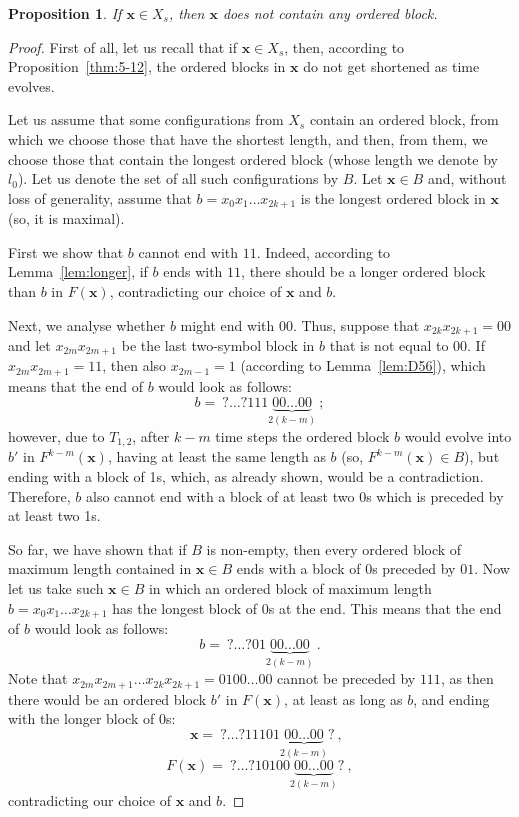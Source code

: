 \documentclass{sn-jnl}
\newtheorem{prop}{Proposition}%
\newcommand{\xconst}{X_{s}}
\newcommand{\bx}{\mathbf{x}}
\begin{document}
\begin{prop}
\label{lem:snakes}
If $\bx\in \xconst$, then $\bx$ does not contain any ordered block.
\end{prop}
\begin{proof}
First of all, let us recall that if $\bx\in\xconst$, then, according to Proposition~\ref{thm:5-12}, the ordered blocks in $\bx$ do not get shortened as time evolves.

Let us assume that some configurations from $\xconst$ contain an ordered block, from which we choose those that have the shortest length, and then, from them, we choose  those that contain the longest ordered block (whose length we denote by $l_0$). Let us denote the set of all such configurations by $B$. 
Let $\bx\in B$ and, without loss of generality, assume that $b=x_{0}x_1\ldots x_{2k+1}$ is the longest ordered block in $\bx$ (so, it is maximal). 

First we show that $b$ cannot end with $11$. 
Indeed, according to Lemma~\ref{lem:longer}, if $b$ ends with $11$, there should be a longer ordered block than $b$ in $F(\bx)$, contradicting our choice of $\bx$ and $b$.

Next, we analyse whether $b$ might end with $00$. Thus, suppose that $x_{2k}x_{2k+1}=00$ and let $x_{2m}x_{2m+1}$ be the last two-symbol block in $b$ that is not equal to $00$. If $x_{2m}x_{2m+1}=11$, then also  $x_{2m-1}=1$ (according to Lemma~\ref{lem:D56}), which means that the end of $b$ would look as follows: 
\[
b = \ ?\ldots?111\underbrace{00\ldots 00}_{2(k-m)}\ ;
\]
however, due to $T_{1,2}$, after $k-m$ time steps the ordered block $b$ would evolve into $b'$ in $F^{k-m}(\bx)$, having at least the same length as $b$ (so, $F^{k-m}(\bx)\in B$), but ending with a block of 1s, which, as already shown, would be a contradiction. Therefore, $b$ also cannot end with a block of at least two 0s which is preceded by at least two 1s.

So far, we have shown that if $B$ is non-empty, then every ordered block of maximum length contained in $\bx\in B$ ends with a block of 0s preceded by $01$. Now let us take such $\bx\in B$ in which an ordered block of maximum length $b=x_{0}x_1\ldots x_{2k+1}$ has the longest block of 0s at the end. This means that the end of $b$ would look as follows: 
\[
b=\ ?\ldots?01\underbrace{00\ldots 00}_{2(k-m)}\ .
\]
Note that $x_{2m}x_{2m+1}\ldots x_{2k}x_{2k+1}=0100\ldots 00$ cannot be preceded by $111$, as then there would be an ordered block $b'$ in $F(\bx)$, at least as long as $b$, and ending with the longer block of 0s:
\[
\phantom{ff}\bx=\ ?\ldots?11101\underbrace{00\ldots 00}_{2(k-m)}? \ , 
\]
\[
F(\bx)=\ ?\ldots?10100\underbrace{00\ldots 00}_{2(k-m)}? \ ,
\]
contradicting our choice of $\bx$ and $b$.


\end{proof}
\end{document}

